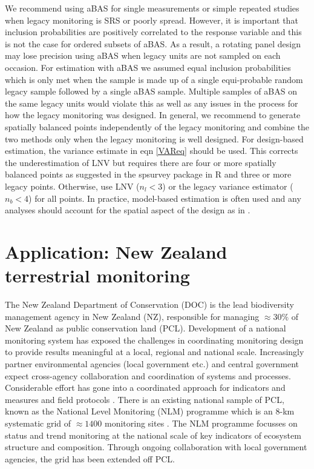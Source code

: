 \documentclass[titlepage]{article}
\begin{document}
We recommend using aBAS for single measurements or simple repeated studies when legacy monitoring is SRS or poorly spread. However, it is important that inclusion probabilities are positively correlated to the response variable \citep{Robertson2017} and this is not the case for ordered subsets of aBAS. As a result, a rotating panel design may lose precision using aBAS when legacy units are not sampled on each occasion. For estimation with aBAS we assumed equal inclusion probabilities which is only met when the sample is made up of a single equi-probable random legacy sample followed by a single aBAS sample. Multiple samples of aBAS on the same legacy units would violate this as well as any issues in the process for how the legacy monitoring was designed. In general, we recommend to generate spatially balanced points independently of the legacy monitoring and combine the two methods only when the legacy monitoring is well designed. For design-based estimation, the variance estimate in eqn \ref{VAReq} should be used. This corrects the underestimation of LNV but requires there are four or more spatially balanced points as suggested in the spsurvey package in R \citep{spsurvey} and three or more legacy points. Otherwise, use LNV ($n_l < 3$) or the legacy variance estimator ($n_b < 4$) for all points. In practice, model-based estimation is often used and any analyses should account for the spatial aspect of the design as in \citet{Foster2017}.

\section{Application: New Zealand terrestrial monitoring}
The New Zealand Department of Conservation (DOC) is the lead biodiversity management agency in New Zealand (NZ), responsible for managing $\approx 30\% $ of New Zealand as public conservation land (PCL). Development of a national monitoring system has exposed the challenges in coordinating monitoring design to provide results meaningful at a local, regional and national scale. Increasingly partner environmental agencies (local government etc.) and central government expect cross-agency collaboration and coordination of systems and processes. Considerable effort has gone into a coordinated approach for indicators and measures and field protocols \citep{DOC}. There is an existing national sample of PCL, known as the National Level Monitoring (NLM) programme which is an 8-km systematic grid of $\approx 1400$ monitoring sites \citep{Coomes2002}. The NLM programme focusses on status and trend monitoring at the national scale of key indicators of ecosystem structure and composition. Through ongoing collaboration with local government agencies, the grid has been extended off PCL.
\end{document}
